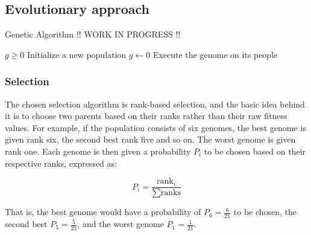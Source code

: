 \subsection{Evolutionary approach}

    \begin{algorithm}
        \caption{Genetic Algorithm !! WORK IN PROGRESS !!}\label{alg:pseudocode_ga}
        \begin{algorithmic}
        \Require $g \geq 0$
        \State Initialize a new population
        \State $g \gets 0$
            \State Execute the genome on its people
        
        
        
        
        \EndWhile
        \end{algorithmic}
    \end{algorithm}

\subsubsection{Selection}

    The chosen selection algorithm is rank-based selection, and the basic idea behind it is to choose two parents based on their ranks rather than their raw fitness values. For example, if the population consists of six genomes, the best genome is given rank six, the second best rank five and so on. The worst genome is given rank one. Each genome is then given a probability $ P_i $ to be chosen based on their respective ranks, expressed as:

    $$ P_i = \frac{\text{rank}_i}{\sum \text{ranks}} $$

    That is, the best genome would have a probability of $ P_6 = \frac{6}{21} $ to be chosen, the second best $ P_5 = \frac{5}{21} $, and the worst genome $ P_1 = \frac{1}{21} $.

